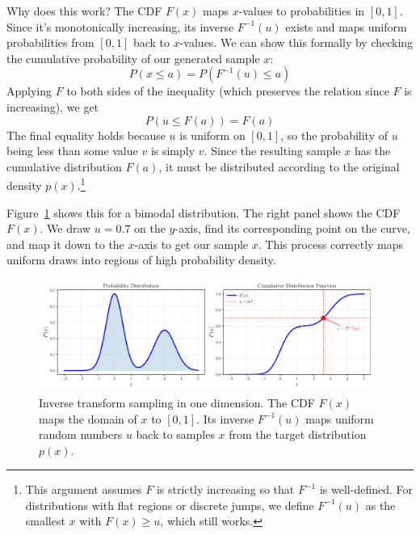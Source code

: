 Why does this work? The CDF $F(x)$ maps $x$-values to probabilities in $[0,1]$. Since it's monotonically increasing, its inverse $F^{-1}(u)$ exists and maps uniform probabilities from $[0,1]$ back to $x$-values. We can show this formally by checking the cumulative probability of our generated sample $x$:
\begin{equation}
    P(x \leq a) = P(F^{-1}(u) \leq a)
\end{equation}
Applying $F$ to both sides of the inequality (which preserves the relation since $F$ is increasing), we get
\begin{equation}
    P(u \leq F(a)) = F(a)
\end{equation}
The final equality holds because $u$ is uniform on $[0,1]$, so the probability of $u$ being less than some value $v$ is simply $v$. Since the resulting sample $x$ has the cumulative distribution $F(a)$, it must be distributed according to the original density $p(x)$.\footnote{This argument assumes $F$ is strictly increasing so that $F^{-1}$ is well-defined. For distributions with flat regions or discrete jumps, we define $F^{-1}(u)$ as the smallest $x$ with $F(x) \geq u$, which still works.}

Figure~\ref{fig:inverse-transform} shows this for a bimodal distribution. The right panel shows the CDF $F(x)$. We draw $u = 0.7$ on the $y$-axis, find its corresponding point on the curve, and map it down to the $x$-axis to get our sample $x$. This process correctly maps uniform draws into regions of high probability density.

\begin{figure}[htbp]
    \centering
    \includegraphics[width=0.98\textwidth]{./figs/monte-carlo/inverse_transform.pdf}
    \caption{Inverse transform sampling in one dimension. The CDF $F(x)$ maps the domain of $x$ to $[0,1]$. Its inverse $F^{-1}(u)$ maps uniform random numbers $u$ back to samples $x$ from the target distribution $p(x)$.}
    \label{fig:inverse-transform}
\end{figure}

